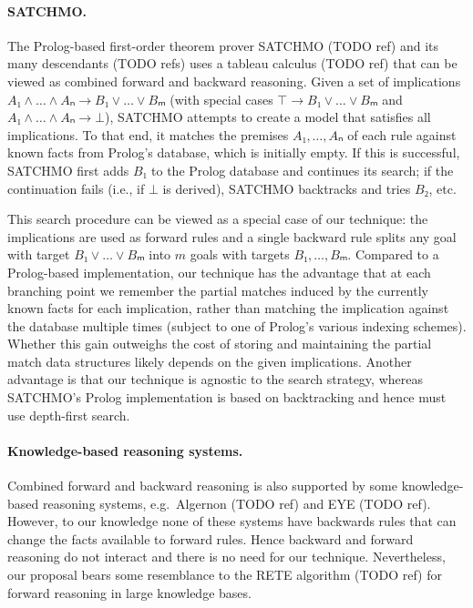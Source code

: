 \documentclass[runningheads]{llncs}
\begin{document}
\paragraph{SATCHMO.}
The Prolog-based first-order theorem prover SATCHMO (TODO ref) and its many descendants (TODO refs) uses a tableau calculus (TODO ref) that can be viewed as combined forward and backward reasoning.
Given a set of implications $A₁ ∧ \dots ∧ Aₙ → B₁ ∨ \dots ∨ Bₘ$ (with special cases $⊤ → B₁ ∨ \dots ∨ Bₘ$ and $A₁ ∧ \dots ∧ Aₙ → ⊥$), SATCHMO attempts to create a model that satisfies all implications.
To that end, it matches the premises $A₁, \dots, Aₙ$ of each rule against known facts from Prolog's database, which is initially empty.
If this is successful, SATCHMO first adds $B₁$ to the Prolog database and continues its search; if the continuation fails (i.e., if $⊥$ is derived), SATCHMO backtracks and tries $B₂$, etc.

This search procedure can be viewed as a special case of our technique: the implications are used as forward rules and a single backward rule splits any goal with target $B₁ ∨ \dots ∨ Bₘ$ into $m$ goals with targets $B₁, \dots, Bₘ$.
Compared to a Prolog-based implementation, our technique has the advantage that at each branching point we remember the partial matches induced by the currently known facts for each implication, rather than matching the implication against the database multiple times (subject to one of Prolog's various indexing schemes).
Whether this gain outweighs the cost of storing and maintaining the partial match data structures likely depends on the given implications.
Another advantage is that our technique is agnostic to the search strategy, whereas SATCHMO's Prolog implementation is based on backtracking and hence must use depth-first search.

\paragraph{Knowledge-based reasoning systems.}
Combined forward and backward reasoning is also supported by some knowledge-based reasoning systems, e.g.\ Algernon (TODO ref) and EYE (TODO ref).
However, to our knowledge none of these systems have backwards rules that can change the facts available to forward rules.
Hence backward and forward reasoning do not interact and there is no need for our technique.
Nevertheless, our proposal bears some resemblance to the RETE algorithm (TODO ref) for forward reasoning in large knowledge bases.
\end{document}

